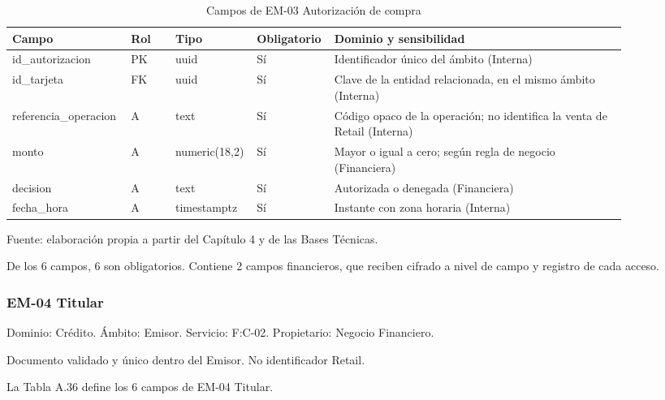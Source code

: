 \documentclass[11pt]{article}
\begin{document}
\begin{table}[htbp]
\caption{Campos de EM-03 Autorización de compra}\label{tab:d_em03}
\centering
\begin{tabular}{@{}p{0.167\linewidth}p{0.070\linewidth}p{0.079\linewidth}p{0.097\linewidth}p{0.465\linewidth}@{}}
\toprule Campo & Rol & Tipo & Obligatorio & Dominio y sensibilidad \\
\midrule
id\_autorizacion & PK & uuid & Sí & Identificador único del ámbito (Interna) \\
id\_tarjeta & FK & uuid & Sí & Clave de la entidad relacionada, en el mismo ámbito (Interna) \\
referencia\_operacion & A & text & Sí & Código opaco de la operación; no identifica la venta de Retail (Interna) \\
monto & A & numeric(18,2) & Sí & Mayor o igual a cero; según regla de negocio (Financiera) \\
decision & A & text & Sí & Autorizada o denegada (Financiera) \\
fecha\_hora & A & timestamptz & Sí & Instante con zona horaria (Interna) \\
\bottomrule
\end{tabular}
\par\smallskip
{\raggedright Fuente: elaboración propia a partir del Capítulo 4 y de las Bases Técnicas.\par}
\end{table}


De los 6 campos, 6 son obligatorios. Contiene 2 campos financieros, que reciben cifrado a nivel de campo y registro de cada acceso.

\subsubsection{EM-04 Titular}

Dominio: Crédito. Ámbito: Emisor. Servicio: F:C-02. Propietario: Negocio Financiero.

Documento validado y único dentro del Emisor. No identificador Retail.

La Tabla A.36 define los 6 campos de EM-04 Titular.

\clearpage
\end{document}
